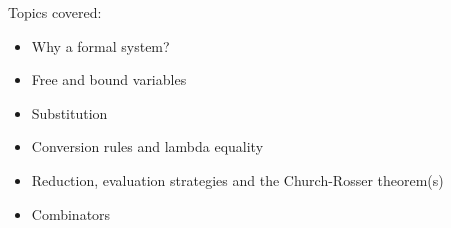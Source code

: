\pagestyle{ColourDemo}

\centerslidesfalse


\def\labelitemi{{\black$\bullet$}}
\def\labelitemii{{\black--}}
\def\labelitemiii{{\black$\ast$}}
\def\labelitemiv{{\black$\cdot$}}


\blue


\begin{slide*}


\vspace*{0.5cm}

Topics covered:

\begin{itemize}

\item Why a formal system?

\item Free and bound variables

\item Substitution

\item Conversion rules and lambda equality

\item Reduction, evaluation strategies and the Church-Rosser theorem(s)

\item Combinators

\end{itemize}

\end{slide*}




